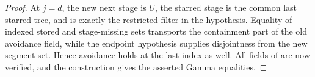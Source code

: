 \begin{proof}
At $j=d$, the new next stage is $U$, the starred stage is the common last
starred tree, and  is exactly the
restricted filter in the hypothesis.  Equality of indexed stored and
stage-missing sets transports the containment part of the old avoidance
field, while the endpoint hypothesis supplies disjointness from the new
segment set.  Hence avoidance holds at the last index as well.  All fields
of  are now verified, and the construction gives
the asserted Gamma equalities.
\end{proof}
